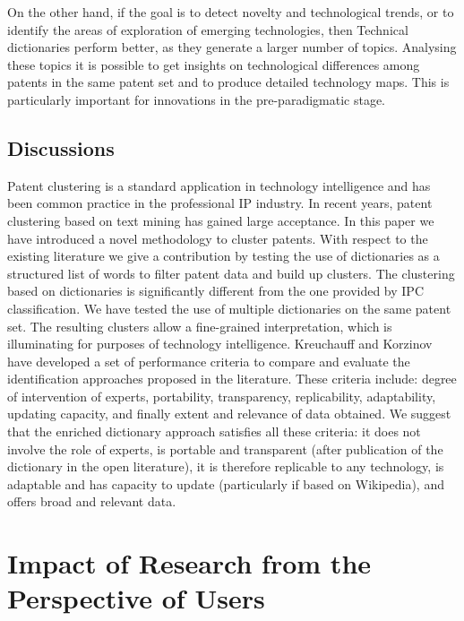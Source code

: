 \documentclass[]{book}
\theoremstyle{definition}
\theoremstyle{definition}
\theoremstyle{definition}
\theoremstyle{remark}
\begin{document}
On the other hand, if the goal is to detect novelty and technological
trends, or to identify the areas of exploration of emerging
technologies, then Technical dictionaries perform better, as they
generate a larger number of topics. Analysing these topics it is
possible to get insights on technological differences among patents in
the same patent set and to produce detailed technology maps. This is
particularly important for innovations in the pre-paradigmatic stage.

\section{Discussions}\label{discussions}

Patent clustering is a standard application in technology intelligence
and has been common practice in the professional IP industry. In recent
years, patent clustering based on text mining has gained large
acceptance. In this paper we have introduced a novel methodology to
cluster patents. With respect to the existing literature we give a
contribution by testing the use of dictionaries as a structured list of
words to filter patent data and build up clusters. The clustering based
on dictionaries is significantly different from the one provided by IPC
classification. We have tested the use of multiple dictionaries on the
same patent set. The resulting clusters allow a fine-grained
interpretation, which is illuminating for purposes of technology
intelligence. Kreuchauff and Korzinov \citep{kreuchauff2017patent} have
developed a set of performance criteria to compare and evaluate the
identification approaches proposed in the literature. These criteria
include: degree of intervention of experts, portability, transparency,
replicability, adaptability, updating capacity, and finally extent and
relevance of data obtained. We suggest that the enriched dictionary
approach satisfies all these criteria: it does not involve the role of
experts, is portable and transparent (after publication of the
dictionary in the open literature), it is therefore replicable to any
technology, is adaptable and has capacity to update (particularly if
based on Wikipedia), and offers broad and relevant data.

\chapter{Impact of Research from the Perspective of
Users}\label{impactresuser}
\end{document}
